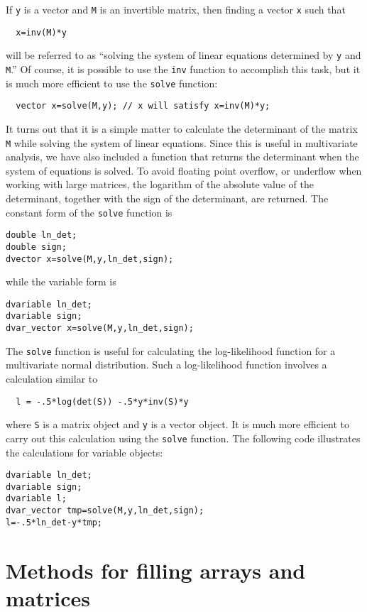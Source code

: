 If \texttt{y} is a vector and \texttt{M} is an invertible matrix, then finding
a vector \texttt{x} such that
\begin{lstlisting}
  x=inv(M)*y
\end{lstlisting}
will be referred to as ``solving the system of linear equations
determined by \texttt{y} and \texttt{M}.'' Of course, it is possible
to use the \texttt{inv} function to accomplish this task, but it is much
more efficient to use the \texttt{solve} function:
\begin{lstlisting}
  vector x=solve(M,y); // x will satisfy x=inv(M)*y;
\end{lstlisting}
It turns out that it is a simple matter to calculate the determinant
of the matrix \texttt{M} while solving the system of linear
equations.  Since this is useful in multivariate
analysis, we have also included a function that returns the 
determinant when the system of equations is solved.
To avoid floating point overflow, or underflow when working with
large matrices, the logarithm of the absolute value of the
determinant, together with the sign of the determinant, are returned.
The constant form of the \texttt{solve} function is
\begin{lstlisting}
double ln_det;
double sign;
dvector x=solve(M,y,ln_det,sign);
\end{lstlisting}
while the variable form is
\begin{lstlisting}
dvariable ln_det;
dvariable sign;
dvar_vector x=solve(M,y,ln_det,sign);
\end{lstlisting}
The \texttt{solve} function is useful for calculating the log-likelihood
function for a multivariate normal distribution.
Such a log-likelihood function involves a calculation similar to
\begin{lstlisting}
  l = -.5*log(det(S)) -.5*y*inv(S)*y
\end{lstlisting}
where \texttt{S} is a matrix object and \texttt{y} is a vector object.
It is much more efficient to carry out this calculation using
the \texttt{solve} function. The following code illustrates the
calculations for variable objects:
\begin{lstlisting}
dvariable ln_det;
dvariable sign;
dvariable l;
dvar_vector tmp=solve(M,y,ln_det,sign);
l=-.5*ln_det-y*tmp;
\end{lstlisting}


\section{Methods for filling arrays and matrices}


